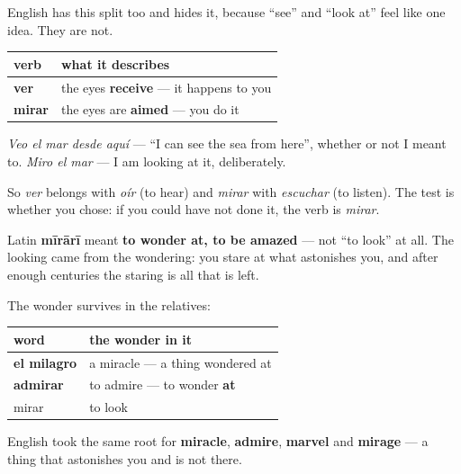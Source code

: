 \begin{grammarlens}[title={Grammar Lens: ver and mirar are not interchangeable}]
English has this split too and hides it, because \textquotedblleft{}see\textquotedblright{} and \textquotedblleft{}look at\textquotedblright{} feel like one idea. They are not.

\noindent
\begin{tabularx}{\linewidth}{@{}>{\raggedright\arraybackslash}X>{\raggedright\arraybackslash}X@{}}
\toprule
\textbf{verb} & \textbf{what it describes} \\
\midrule
\textbf{ver} & the eyes \textbf{receive} — it happens to you \\
\textbf{mirar} & the eyes are \textbf{aimed} — you do it \\
\bottomrule
\end{tabularx}

\emph{Veo el mar desde aquí} — \textquotedblleft{}I can see the sea from here\textquotedblright{}, whether or not I meant to. \emph{Miro el mar} — I am looking at it, deliberately.

So \emph{ver} belongs with \emph{oír} (to hear) and \emph{mirar} with \emph{escuchar} (to listen). The test is whether you chose: if you could have not done it, the verb is \emph{mirar}.
\end{grammarlens}

\begin{cousinweb}
Latin \textbf{mīrārī} meant \textbf{to wonder at, to be amazed} — not \textquotedblleft{}to look\textquotedblright{} at all. The looking came from the wondering: you stare at what astonishes you, and after enough centuries the staring is all that is left.

The wonder survives in the relatives:

\noindent
\begin{tabularx}{\linewidth}{@{}>{\raggedright\arraybackslash}X>{\raggedright\arraybackslash}X@{}}
\toprule
\textbf{word} & \textbf{the wonder in it} \\
\midrule
\textbf{el milagro} & a miracle — a thing wondered at \\
\textbf{admirar} & to admire — to wonder \textbf{at} \\
mirar & to look \\
\bottomrule
\end{tabularx}

English took the same root for \textbf{miracle}, \textbf{admire}, \textbf{marvel} and \textbf{mirage} — a thing that astonishes you and is not there.
\end{cousinweb}

